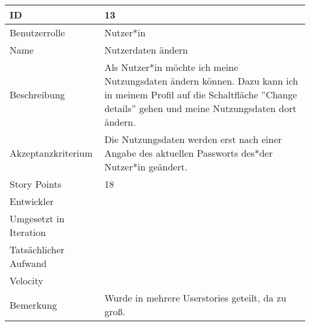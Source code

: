 \begin{tabularx}{\textwidth}{|p{}|X|}
	\hline
	ID & 13\\
	\hline
	Benutzerrolle & Nutzer*in\\
	\hline
	Name & Nutzerdaten ändern\\
	\hline
	Beschreibung & Als Nutzer*in möchte ich meine Nutzungsdaten ändern können. Dazu kann ich in meinem Profil auf die Schaltfläche ''Change details'' gehen und meine Nutzungsdaten dort ändern.\\
	\hline
	Akzeptanzkriterium & Die Nutzungsdaten werden erst nach einer Angabe des aktuellen Passworts des*der Nutzer*in geändert.\\
	\hline
	Story Points & 18\\
	\hline
	Entwickler & \\
	\hline
	Umgesetzt in Iteration & \\ 
	\hline
	Tatsächlicher Aufwand & \\
	\hline
	Velocity & \\
	\hline
	Bemerkung & Wurde in mehrere Userstories geteilt, da zu groß.\\
	\hline
\end{tabularx}
\vspace{20pt}
